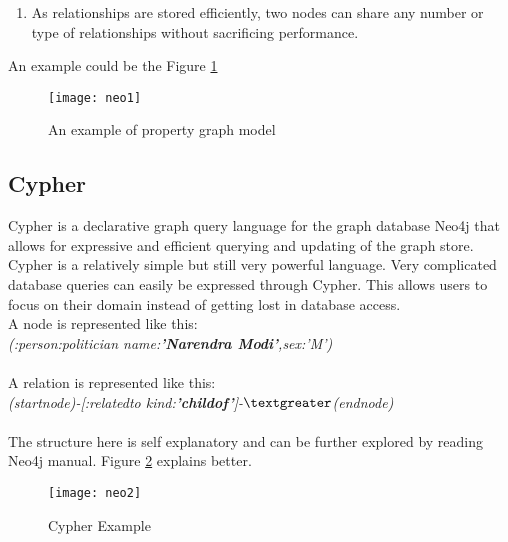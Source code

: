 \begin{enumerate}

\item As relationships are stored efficiently, two nodes can share any number or type of relationships without sacrificing performance.

\end{enumerate}

An example could be the Figure \ref{fig:neo1}

\begin{figure}[H]
\begin{center}  
\texttt{[image: neo1]} 
\caption{An example of property graph model}
\label{fig:neo1}
\end{center}
\end{figure}

\subsection{Cypher}

Cypher is a declarative graph query language for the graph database Neo4j that allows for expressive and efficient querying and updating of the graph store. Cypher is a relatively simple but still very powerful language. Very complicated database queries can easily be expressed through Cypher. This allows users to focus on their domain instead of getting lost in database access. \\

A node is represented like this: \\
    \emph{(:person:politician {name:\textbf{'Narendra Modi'},sex:'M'})}\\ \\
A relation is represented like this:\\
    \emph{(startnode)-[:relatedto {kind:\textbf{'childof'}}]-$\textgreater$(endnode)}\\ \\
The structure here is self explanatory and can be further explored by reading Neo4j manual. Figure \ref{fig:neo2} explains better.


\begin{figure}[H]
\begin{center}  
\texttt{[image: neo2]} 
\caption{Cypher Example}
\label{fig:neo2}
\end{center}
\end{figure}


